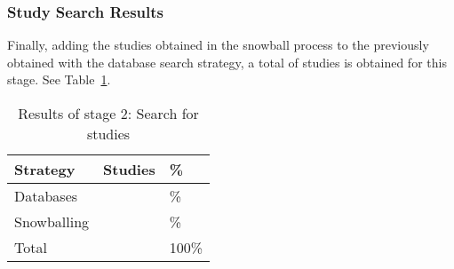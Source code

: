 \newcommand{\totalEtapaDos}{\fpeval{\screenTot + \snowballNewStudies}}
\newcommand{\dbPercentEtapa}{\fpeval{round(\screenTot*100/\totalEtapaDos,2)}}
\newcommand{\snowPercentEtapa}{\fpeval{round(\snowballNewStudies*100/\totalEtapaDos,2)}}

\subsubsection{Study Search Results}\label{subsubsec:resultados-busqueda}

Finally, adding the \snowballNewStudies{} studies obtained in the snowball process to the \screenTot{} previously obtained with the database search strategy, a total of \totalEtapaDos{} studies is obtained for this stage. See Table~\ref{table:resultados_etapa_2}.

\begin{table}[htbp]
	\centering
	\caption{Results of stage 2: Search for studies}
	\label{table:resultados_etapa_2}
	\renewcommand{\arraystretch}{1}  %
	\begin{tabular}{p{2.5cm}p{2.6cm}p{2.5cm}}
		\toprule
		\textbf{Strategy} & \textbf{Studies}      & \textbf{\%}           \\
		\midrule
		Databases         & \screenTot{}          & \dbPercentEtapa{}\%   \\
		\addlinespace[0.8em]
		Snowballing       & \snowballNewStudies{} & \snowPercentEtapa{}\% \\
		\addlinespace[0.8em]
		Total             & \totalEtapaDos        & 100\%                 \\
		\bottomrule
	\end{tabular}
\end{table}
